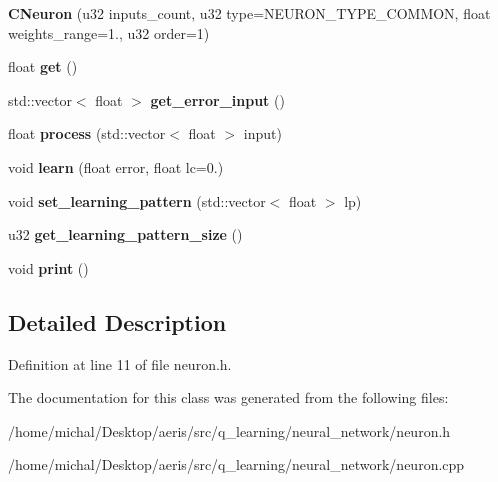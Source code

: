 \begin{DoxyCompactItemize}
\item 
\hypertarget{classCNeuron_ae9f32d41d2bb7b9683a440e038f5b6f6}{{\bfseries C\-Neuron} (u32 inputs\-\_\-count, u32 type=N\-E\-U\-R\-O\-N\-\_\-\-T\-Y\-P\-E\-\_\-\-C\-O\-M\-M\-O\-N, float weights\-\_\-range=1., u32 order=1)}\label{classCNeuron_ae9f32d41d2bb7b9683a440e038f5b6f6}

\item 
\hypertarget{classCNeuron_af97048090878729c7d99dcb8363e61ff}{float {\bfseries get} ()}\label{classCNeuron_af97048090878729c7d99dcb8363e61ff}

\item 
\hypertarget{classCNeuron_a50f6d18278e8fa7cd4d189657b019989}{std\-::vector$<$ float $>$ {\bfseries get\-\_\-error\-\_\-input} ()}\label{classCNeuron_a50f6d18278e8fa7cd4d189657b019989}

\item 
\hypertarget{classCNeuron_a0b9c5ff02de4dae0f2bc98d81810d597}{float {\bfseries process} (std\-::vector$<$ float $>$ input)}\label{classCNeuron_a0b9c5ff02de4dae0f2bc98d81810d597}

\item 
\hypertarget{classCNeuron_a64eb412ce09f2f59077281d86a085303}{void {\bfseries learn} (float error, float lc=0.)}\label{classCNeuron_a64eb412ce09f2f59077281d86a085303}

\item 
\hypertarget{classCNeuron_a0bcb7781406fa9a282eaafe4b154b5b6}{void {\bfseries set\-\_\-learning\-\_\-pattern} (std\-::vector$<$ float $>$ lp)}\label{classCNeuron_a0bcb7781406fa9a282eaafe4b154b5b6}

\item 
\hypertarget{classCNeuron_ad3cfde2fc3314e525345e8ec6595b1cb}{u32 {\bfseries get\-\_\-learning\-\_\-pattern\-\_\-size} ()}\label{classCNeuron_ad3cfde2fc3314e525345e8ec6595b1cb}

\item 
\hypertarget{classCNeuron_a37db8b58d3d3cd00c2cdc12b0a7466b3}{void {\bfseries print} ()}\label{classCNeuron_a37db8b58d3d3cd00c2cdc12b0a7466b3}

\end{DoxyCompactItemize}


\subsection{Detailed Description}


Definition at line 11 of file neuron.\-h.



The documentation for this class was generated from the following files\-:\begin{DoxyCompactItemize}
\item 
/home/michal/\-Desktop/aeris/src/q\-\_\-learning/neural\-\_\-network/neuron.\-h\item 
/home/michal/\-Desktop/aeris/src/q\-\_\-learning/neural\-\_\-network/neuron.\-cpp\end{DoxyCompactItemize}
